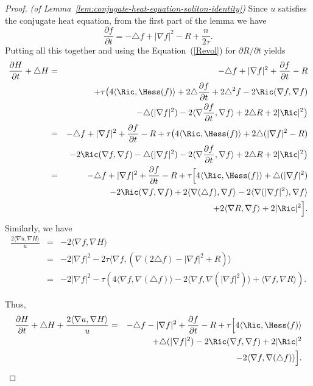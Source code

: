 \begin{proof}{\em (of Lemma~\ref{lem:conjugate-heat-equation-soliton-identity})}
Since $u$ satisfies the conjugate heat equation, from the first part
of the lemma we have
\begin{equation}\label{feqn}\frac{\partial f}{\partial t}=-\triangle f+|\nabla
f|^2-R+\frac{n}{2\tau}.\end{equation}
 Putting all this together and
using the Equation~(\ref{Revol}) for $\partial R/\partial t$ yields
\begin{eqnarray*}
\frac{\partial H}{\partial t}+\triangle H & = & -\triangle f+|\nabla
f|^2+\frac{\partial f}{\partial t}-R \\ & & +\tau\bigl(4\langle \Ric,\Hess(f)\rangle+2\triangle \frac{\partial f}{\partial t}
+2\triangle^2f-2\Ric(\nabla f,\nabla f)\bigr. \\
& & \bigl.-\triangle(|\nabla f|^2) -2\langle \nabla\frac{\partial
f}{\partial t},\nabla f\rangle+2\triangle
R +2|\Ric|^2\bigr) \\
& = & -\triangle f+|\nabla f|^2+\frac{\partial f}{\partial t}-R
+\tau\bigl(4\langle \Ric,\Hess(f)\rangle+2\triangle(|\nabla f|^2-R)\bigr.
\\
& & \bigl.-2\Ric(\nabla f,\nabla f)-\triangle(|\nabla
f|^2)-2\langle\nabla\frac{\partial f}{\partial t},\nabla
f\rangle+2\triangle R+2|\Ric|^2\bigr)
\\
& = & -\triangle f+|\nabla f|^2+\frac{\partial f}{\partial
t}-R+\tau\Bigl[4\langle \Ric,\Hess(f)\rangle+\triangle(|\nabla f|^2)\Bigr.
\\
& & -2\Ric(\nabla f,\nabla f)  +2\langle\nabla(\triangle
f),\nabla f\rangle -2\langle \nabla(|\nabla f|^2),\nabla
f\rangle \\
& & \Bigl. +2\langle\nabla R,\nabla f\rangle+2|\Ric|^2\Bigr].
\end{eqnarray*}
Similarly, we have
\begin{eqnarray*}
\frac{2\langle\nabla u,\nabla H\rangle}{u} & = & -2\langle\nabla f,\nabla H\rangle \\
& = & -2|\nabla f|^2-2\tau\langle\nabla f,\left(\nabla(2\triangle
f)-|\nabla f|^2+R\right)\rangle \\
& = & -2|\nabla f|^2-\tau\left(4\langle\nabla f,\nabla(\triangle
f)\rangle-2\langle\nabla f,\nabla(|\nabla f|^2)\rangle+\langle\nabla
f,\nabla R\rangle\right).
\end{eqnarray*}

Thus,
\begin{eqnarray*}
\frac{\partial H}{\partial t} +\triangle H+\frac{2\langle\nabla
u,\nabla H\rangle}{u} & = & -\triangle f-|\nabla f|^2+\frac{\partial
f}{\partial t}-R + \tau\Bigl[4\langle \Ric,\Hess(f)\rangle
\Bigr.
\\
& & +\triangle(|\nabla f|^2)-2\Ric(\nabla f,\nabla f)+2|\Ric|^2
\\
& & \Bigl.-2\langle\nabla f,\nabla(\triangle f)\rangle\Bigr].
\end{eqnarray*}


\end{proof}
